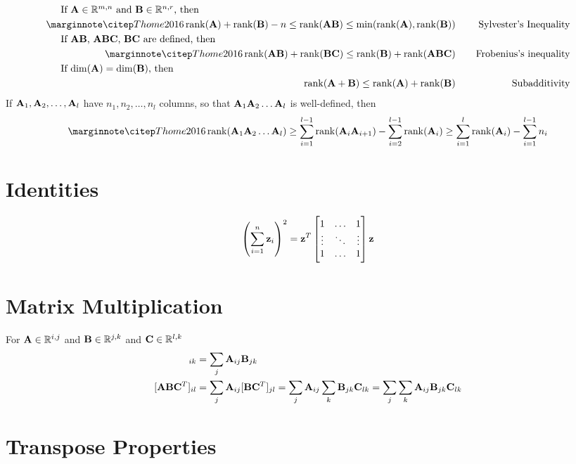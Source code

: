 \begin{align}
\noalign{If $\mA\in\sRmn$ and $\mB\in\sRnr$, then}
\eqcite{Thome2016}
\rank(\mA)+\rank(\mB)-n\le \rank(\mA\mB)\le \min(\rank(\mA),\rank(\mB)) &&~~~~\textrm{Sylvester's Inequality} \\
\noalign{If $\mA\mB$, $\mA\mB\mC$, $\mB\mC$ are defined, then}
\eqcite{Thome2016}
\rank(\mA\mB)+\rank(\mB\mC)\le \rank(\mB)+\rank(\mA\mB\mC) && \textrm{Frobenius's inequality} \\
\noalign{If $\dim(\mA)=\dim(\mB)$, then}
\rank(\mA+\mB)\le\rank(\mA)+\rank(\mB) &&\textrm{Subadditivity}
\end{align}
If $\mathbf{A}_1, \mathbf{A}_2, \ldots, \mathbf{A}_l$ have $n_1,n_2,\ldots,n_l$ columns, so that $\mathbf{A}_1\mathbf{A}_2\ldots\mathbf{A}_l$ is well-defined, then
\begin{equation}
\eqcite{Thome2016}
\rank(\mA_1\mA_2\ldots\mA_l)
\ge \sum_{i=1}^{l-1}\rank(\mA_i\mA_{i+1})-\sum_{i=2}^{l-1}\rank(\mA_i)
\ge\sum_{i=1}^l\rank(\mA_i)-\sum_{i=1}^{l-1}n_i
\end{equation}

\section{Identities}
\begin{align}
\left(\sum_{i=1}^n \mathbf{z}_i\right)^2 = \mathbf{z}^T
\begin{bmatrix}
1      & \hdots & 1      \\
\vdots & \ddots & \vdots \\
1      & \hdots & 1
\end{bmatrix}
\mathbf{z}
\end{align}

\section{Matrix Multiplication}

For $\mathbf{A}\in\mathbb{R}^{i,j}$ and $\mathbf{B}\in\mathbb{R}^{j,k}$ and $\mathbf{C}\in\mathbb{R}^{l,k}$
\begin{align}
[\mA\mB]_{ik} &= \sum_j \mA_{ij}\mB_{jk} \\
[\mA\mB\mC^T]_{il} &= \sum_j \mA_{ij}[\mB\mC^T]_{jl}=\sum_j \mA_{ij}\sum_k \mB_{jk}\mC_{lk}=\sum_j\sum_k \mA_{ij}\mB_{jk}\mC_{lk}
\end{align}



\section{Transpose Properties}


